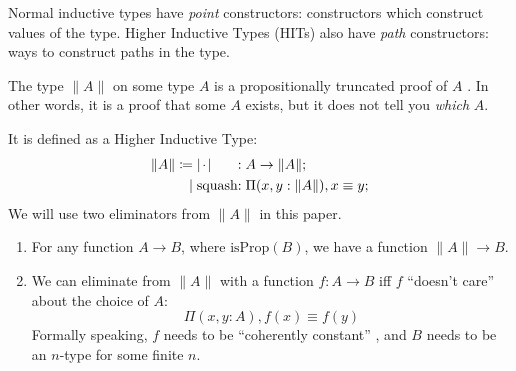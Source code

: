 \begin{definition} \label{HITs}
  Normal inductive types have \emph{point} constructors: constructors which
  construct values of the type.
  Higher Inductive Types (HITs) also have \emph{path} constructors: ways to
  construct paths in the type.
\end{definition}
\begin{definition} \label{prop-trunc}
  The type \(\lVert A \rVert\) on some type \(A\) is a propositionally truncated
  proof of \(A\) \cite[3.7]{hottbook}.
  In other words, it is a proof that some \(A\) exists, but it does not tell you
  \emph{which} \(A\).

  It is defined as a Higher Inductive Type:
  \begin{equation} {
    \begin{alignedat}{3}
      \lVert A \rVert \coloneqq & \; \lvert {\mkern 2mu\cdot\mkern 2mu}\rvert &:& \; A \rightarrow \lVert A \rVert ; \\
                              | & \; \text{squash}     &:& \; \Pi {(x, y : \lVert A \rVert)} , x \equiv y  ; 
    \end{alignedat} }
  \end{equation}
  We will use two eliminators from \(\lVert A \rVert\) in this paper.
  \begin{enumerate}
  \item \label{elim-prop-prop} For any function \(A \rightarrow B\), where
    \(\text{isProp}(B)\), we have a function \(\lVert A \rVert \rightarrow B\).
  \item \label{elim-prop-coh} We can eliminate from \(\lVert A \rVert\) with a
    function \(f : A \rightarrow B\) iff \(f\) ``doesn't care'' about the
    choice of \(A\):
    \[\Pi {(x , y : A)} , f(x) \equiv f(y) \]
    Formally speaking, \(f\) needs to be ``coherently constant''
    \cite{krausGeneralUniversalProperty2015}, and \(B\) needs to be an
    \(n\)-type for some finite \(n\).
  \end{enumerate}
\end{definition}

